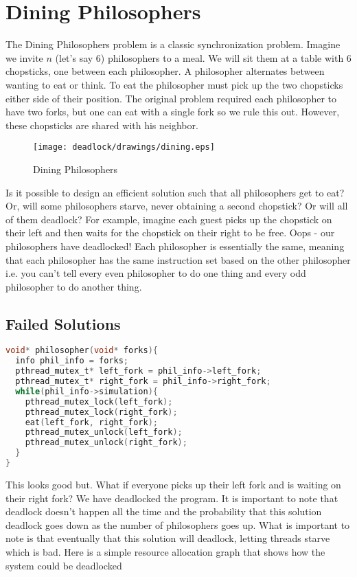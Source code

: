 \section{Dining Philosophers}

The Dining Philosophers problem is a classic synchronization problem.
Imagine we invite $n$ (let's say 6) philosophers to a meal.
We will sit them at a table with 6 chopsticks, one between each philosopher.
A philosopher alternates between wanting to eat or think.
To eat the philosopher must pick up the two chopsticks either side of their position.
The original problem required each philosopher to have two forks, but one can eat with a single fork so we rule this out.
However, these chopsticks are shared with his neighbor.

\begin{figure}[H]
\centering
\texttt{[image: deadlock/drawings/dining.eps]}
\caption{Dining Philosophers}
\end{figure}

Is it possible to design an efficient solution such that all philosophers get to eat?
Or, will some philosophers starve, never obtaining a second chopstick?
Or will all of them deadlock?
For example, imagine each guest picks up the chopstick on their left and then waits for the chopstick on their right to be free.
Oops - our philosophers have deadlocked!
Each philosopher is essentially the same, meaning that each philosopher has the same instruction set based on the other philosopher i.e. you can't tell every even philosopher to do one thing and every odd philosopher to do another thing.

\subsection{Failed Solutions}

\begin{lstlisting}[language=C]
void* philosopher(void* forks){
  info phil_info = forks;
  pthread_mutex_t* left_fork = phil_info->left_fork;
  pthread_mutex_t* right_fork = phil_info->right_fork;
  while(phil_info->simulation){
    pthread_mutex_lock(left_fork);
    pthread_mutex_lock(right_fork);
    eat(left_fork, right_fork);
    pthread_mutex_unlock(left_fork);
    pthread_mutex_unlock(right_fork);
  }
}
\end{lstlisting}

This looks good but.
What if everyone picks up their left fork and is waiting on their right fork? We have deadlocked the program.
It is important to note that deadlock doesn't happen all the time and the probability that this solution deadlock goes down as the number of philosophers goes up.
What is important to note is that eventually that this solution will deadlock, letting threads starve which is bad.
Here is a simple resource allocation graph that shows how the system could be deadlocked

